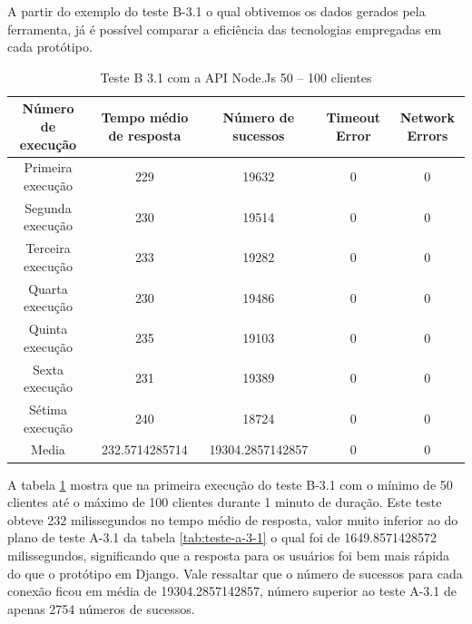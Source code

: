   A partir do exemplo do teste B-3.1 o qual obtivemos os dados gerados pela ferramenta, já é possível comparar a eficiência das 
  tecnologias empregadas em cada protótipo.
  
  \begin{table}[H]
    \centering
    \footnotesize
    \setlength{\abovecaptionskip}{0pt}
    \setlength{\belowcaptionskip}{0pt}
    \caption[Teste B-3.1 com a API Node.Js 50 – 100 clientes]{Teste B 3.1 com a API Node.Js 50 – 100 clientes}
    \label{tab:teste-b-3-1}
    \begin{tabular}{c|c|c|c|c}
      \hline \hline
      Número de execução &	Tempo médio de resposta &	Número de sucessos &	Timeout Error &		 Network Errors \\
      \hline \hline
      Primeira execução &	229 &				19632 &			0 &				0 \\
      Segunda execução &	230 &				19514 &			0 &				0 \\
      Terceira execução &	233 &				19282 &			0 &				0 \\
      Quarta execução  &	230 &				19486 &			0 &				0 \\
      Quinta execução  &	235 &				19103 &			0 &				0 \\
      Sexta execução   &	231 &				19389 &			0 &				0 \\
      Sétima execução  &	240 &				18724 &			0 &				0 \\
      Media & 			232.5714285714 &		19304.2857142857 & 	0 &				0 \\
      \hline \hline
    \end{tabular}
  \end{table}
  
  A tabela \ref{tab:teste-b-3-1} mostra que na primeira execução do teste B-3.1 com o mínimo de 50 clientes até o máximo de 100 clientes
  durante 1 minuto de duração. Este teste obteve 232 milissegundos no tempo médio de resposta, valor muito inferior ao do plano de
  teste A-3.1 da tabela \ref{tab:teste-a-3-1} o qual foi de 1649.8571428572 milissegundos, significando que a resposta para os usuários
  foi bem mais rápida do que o protótipo em Django. Vale ressaltar que o número de sucessos para cada conexão ficou em média de 
  19304.2857142857, número superior ao teste A-3.1 de apenas 2754 números de sucessos.
  
